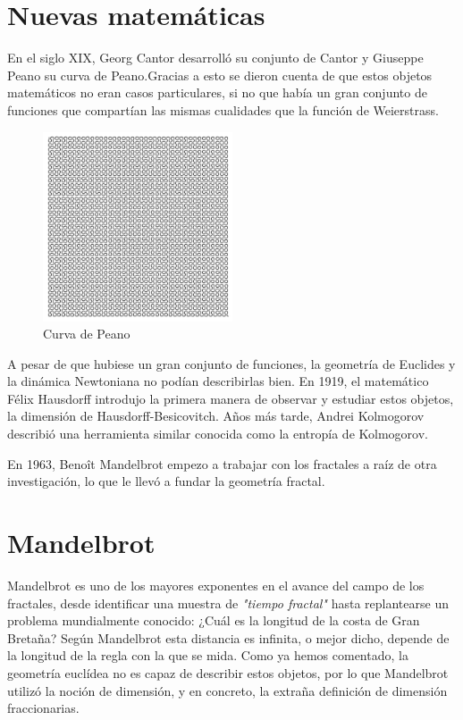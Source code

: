 \section{Nuevas matemáticas}

\noindent En el siglo XIX, Georg Cantor desarrolló su conjunto de Cantor y 
Giuseppe Peano su curva de Peano.Gracias a esto se dieron cuenta de que estos objetos matemáticos no eran casos particulares, si no que había un gran conjunto de funciones que compartían las mismas cualidades que la función de Weierstrass.\\

\begin{figure}[H]
    \centering
    \includegraphics[width=0.5\textwidth]{figures/peano-curve.jpg}
    \caption{Curva de Peano}
    \label{fig:peano-curve}
\end{figure}


\noindent A pesar de que hubiese un gran conjunto de funciones, la geometría de Euclides y la dinámica Newtoniana no podían describirlas bien. En 1919, el matemático Félix Hausdorff introdujo la primera manera de observar y estudiar estos objetos, la dimensión de Hausdorff-Besicovitch. Años más tarde, Andrei Kolmogorov describió una herramienta similar conocida como la entropía de Kolmogorov.

\noindent En 1963, Benoît Mandelbrot empezo a trabajar con los fractales a raíz de otra investigación, lo que le llevó a fundar la geometría fractal.

\section{Mandelbrot}

\noindent Mandelbrot es uno de los mayores exponentes en el avance del campo de los fractales, desde identificar una muestra de \textit{"tiempo fractal"} hasta replantearse un problema mundialmente conocido: ¿Cuál es la longitud de la costa de Gran Bretaña? Según Mandelbrot esta distancia es infinita, o mejor dicho, depende de la longitud de la regla con la que se mida. Como ya hemos comentado, la geometría euclídea no es capaz de describir estos objetos, por lo que Mandelbrot utilizó la noción de dimensión, y en concreto, la extraña definición de dimensión fraccionarias.\\

